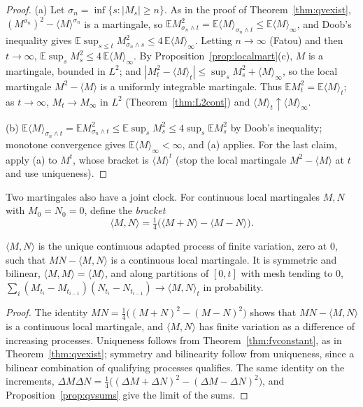 \begin{proof}
(a) Let $\sigma_n=\inf\{s:|M_s|\ge n\}$. As in the proof of Theorem~\ref{thm:qvexist}, $(M^{\sigma_n})^2-\langle M\rangle^{\sigma_n}$ is a martingale, so $\mathbb EM^2_{\sigma_n\wedge t}=\mathbb E\langle M\rangle_{\sigma_n\wedge t}\le\mathbb E\langle M\rangle_\infty$,
and Doob's inequality gives $\mathbb E\sup_{s\le t}M^2_{\sigma_n\wedge s}\le4\,\mathbb E\langle M\rangle_\infty$. Letting $n\to\infty$ (Fatou) and then $t\to\infty$, $\mathbb E\sup_sM_s^2\le4\,\mathbb E\langle M\rangle_\infty$. By
Proposition~\ref{prop:localmart}(c), $M$ is a martingale, bounded in $L^2$; and $|M_t^2-\langle M\rangle_t|\le\sup_sM_s^2+\langle M\rangle_\infty$, so the local martingale $M^2-\langle M\rangle$ is a uniformly integrable
martingale. Thus $\mathbb EM_t^2=\mathbb E\langle M\rangle_t$; as $t\to\infty$, $M_t\to M_\infty$ in $L^2$ (Theorem~\ref{thm:L2cont}) and $\langle M\rangle_t\uparrow\langle M\rangle_\infty$.

(b) $\mathbb E\langle M\rangle_{\sigma_n\wedge t}=\mathbb EM^2_{\sigma_n\wedge t}\le\mathbb E\sup_sM_s^2\le4\sup_s\mathbb EM_s^2$ by Doob's inequality; monotone convergence gives $\mathbb E\langle M\rangle_\infty<\infty$, and (a) applies.
For the last claim, apply (a) to $M^t$, whose bracket is $\langle M\rangle^t$ (stop the local martingale $M^2-\langle M\rangle$ at $t$ and use uniqueness).
\end{proof}

Two martingales also have a joint clock. For continuous local martingales $M,N$ with $M_0=N_0=0$, define the \emph{bracket}
\[
\langle M,N\rangle=\tfrac14\bigl(\langle M+N\rangle-\langle M-N\rangle\bigr).
\]

\begin{proposition}\label{prop:bracket}
$\langle M,N\rangle$ is the unique continuous adapted process of finite variation, zero at $0$, such that $MN-\langle M,N\rangle$ is a continuous local martingale. It is symmetric and bilinear,
$\langle M,M\rangle=\langle M\rangle$, and along partitions of $[0,t]$ with mesh tending to $0$, $\sum_i(M_{t_i}-M_{t_{i-1}})(N_{t_i}-N_{t_{i-1}})\to\langle M,N\rangle_t$ in probability.
\end{proposition}

\begin{proof}
The identity $MN=\frac14\bigl((M+N)^2-(M-N)^2\bigr)$ shows that $MN-\langle M,N\rangle$ is a continuous local martingale, and $\langle M,N\rangle$ has finite variation as a difference of increasing processes. Uniqueness
follows from Theorem~\ref{thm:fvconstant}, as in Theorem~\ref{thm:qvexist}; symmetry and bilinearity follow from uniqueness, since a bilinear combination of qualifying processes qualifies. The same identity on the
increments, $\Delta M\Delta N=\frac14\bigl((\Delta M+\Delta N)^2-(\Delta M-\Delta N)^2\bigr)$, and Proposition~\ref{prop:qvsums} give the limit of the sums.
\end{proof}

